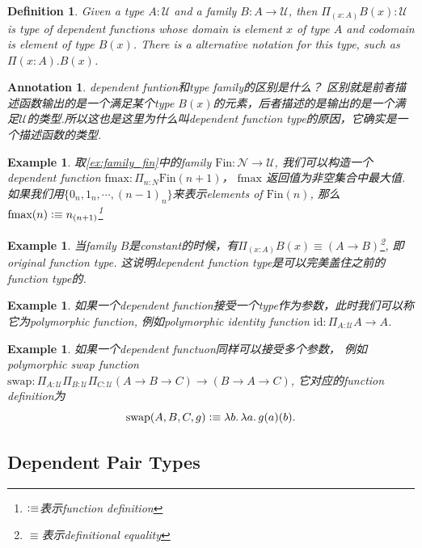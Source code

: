 \documentclass{article}
\newtheorem{example}[theorem]{Example}
\newtheorem{definition}[theorem]{Definition}
\newtheorem{annotation}[theorem]{Annotation}
\newcommand{\lam}[2]{\ensuremath{\lambda #1\ldotp #2}} %
\newcommand{\defeqv}{\vcentcolon\equiv}
\begin{document}
\begin{definition}
\rm Given a type $A:\mathcal{U}$ and a family $B:A \to \mathcal{U}$, then $\Pi_{(x:A)} B(x):\mathcal{U}$ is type of dependent functions whose domain is element $x$ of type $A$ and  codomain is element of type $B(x)$. There is a alternative notation for this type, such as $\Pi(x : A).B(x)$.
\end{definition}

\begin{annotation}
\rm dependent funtion和type family的区别是什么？ 区别就是前者描述函数输出的是一个满足某个type $B(x)$的元素，后者描述的是输出的是一个满足$\mathcal{U}$的类型.所以这也是这里为什么叫dependent function type的原因，它确实是一个描述函数的类型.
\end{annotation}


\begin{example}
\rm 取\ref{ex:family_fin}中的family $\text{Fin}:\mathcal{N} \to \mathcal{U}$, 我们可以构造一个dependent function $\text{fmax}:\Pi_{n : N} \text{Fin}(n+1)$， $\text{fmax}$
返回值为非空集合中最大值. 如果我们用$\{0_{n}, 1_{n}, \cdots, (n-1)_n\}$来表示elements of $\text{Fin}(n)$, 那么$\text{fmax}(n) \defeqv n_{(n+1)}$\footnote{$\defeqv$表示function definition} 
\end{example}

\begin{example}
\rm 当family $B$是constant的时候，有$\Pi_{(x:A)} B(x) \equiv (A \to B)$\footnote{$\equiv$表示definitional equality}, 即original function type. 这说明dependent function type是可以完美盖住之前的function type的.
\end{example}

\begin{example}
\rm 如果一个dependent function接受一个type作为参数，此时我们可以称它为polymorphic function, 例如polymorphic identity function $\text{id}:\Pi_{A:\mathcal{U}} A \to A$.
\end{example}

\begin{example}
\rm 如果一个dependent functuon同样可以接受多个参数， 例如polymorphic swap function $\text{swap}: \Pi_{A:\mathcal{U}}\Pi_{B:\mathcal{U}}\Pi_{C:\mathcal{U}}(A \to B \to C) \to (B \to A \to C)$, 它对应的function definition为
\[
	\text{swap}(A,B,C,g) \defeqv \lam{b}{\lam{a}{g(a)(b)}}.
\]
\end{example}

\subsection{Dependent Pair Types}
\end{document}
